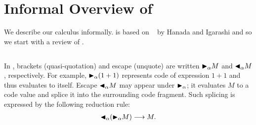 
\section{Informal Overview of \LMD \label{sec:informal-overview}}

We describe our calculus \LMD informally.  \LMD is based on
\LTP~\cite{Hanada2014} by Hanada and Igarashi and so we start with a review of 
\LTP.

\subsection{\LTP}


In \LTP, brackets (quasi-quotation) and escape (unquote) are written
${\mathop{\blacktriangleright}}_\alpha M$ and ${\mathop{\blacktriangleleft}}_\alpha M$, respectively.  For example,
${\mathop{\blacktriangleright}}_\alpha (1 + 1)$ represents code of expression $1 + 1$ and thus
evaluates to itself.  Escape ${\mathop{\blacktriangleleft}}_\alpha M$ may appear under
${\mathop{\blacktriangleright}}_\alpha$; it evaluates $M$ to a code value and splice it into the
surrounding code fragment.  Such splicing is expressed by the
following reduction rule:
\begin{align*}
	{\mathop{\blacktriangleleft}}_\alpha ({\mathop{\blacktriangleright}}_\alpha M) \longrightarrow M .
\end{align*}

